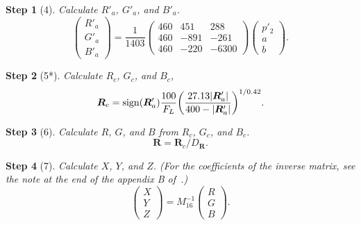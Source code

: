 \documentclass[twocolumn]{scrartcl}
\theoremstyle{named}
\newtheorem*{step}{Step}
\DeclarePairedDelimiter\abs{\lvert}{\rvert}%
\DeclareMathOperator{\sign}{sign}
\newcommand\rgb{\bm{R}}
\begin{document}
\begin{step}[4]
  Calculate $R'_a$, $G'_a$, and $B'_a$.
  \[
  \begin{pmatrix}
    R'_a\\G'_a\\B'_a
  \end{pmatrix}
  =
  \frac{1}{1403}
  \begin{pmatrix}
    460 & 451 & 288\\
    460 & -891 & -261\\
    460 & -220 & -6300
  \end{pmatrix}
  \begin{pmatrix}
    p'_2\\a\\b
  \end{pmatrix}.
  \]%
\end{step}

\begin{step}[5*]
Calculate $R_c$, $G_c$, and $B_c$,
  \[
  \rgb_c = \sign(\rgb'_a)
  \frac{100}{F_L} {\left(
    \frac{27.13 \abs{\rgb'_a}}{400 - \abs{\rgb'_a}}
    \right)}^{1/0.42}.
  \]
\end{step}

\begin{step}[6]
Calculate $R$, $G$, and $B$ from $R_c$, $G_c$, and $B_c$.
\[
  \rgb = \rgb_c / D_{\rgb}.
\]
\end{step}

\begin{step}[7]
Calculate $X$, $Y$, and $Z$. (For the coefficients of the inverse matrix, see
the note at the end of the appendix B of~\cite{cam16}.)
\[
\begin{pmatrix}X\\Y\\Z\end{pmatrix}
  = M_{16}^{-1}
\begin{pmatrix}R\\G\\B\end{pmatrix}.
\]
\end{step}

\printbibliography{}
\end{document}
